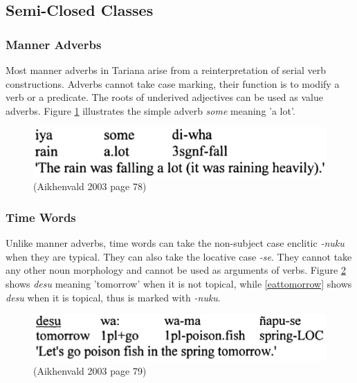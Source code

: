 \documentclass{article}
\begin{document}

\subsection{Semi-Closed Classes}
\subsubsection{Manner Adverbs}
Most manner adverbs in Tariana arise from a reinterpretation of serial verb constructions. Adverbs cannot take case marking, their function is to modify a verb or a predicate. The roots of underived adjectives can be used as value adverbs. Figure \ref*{raining} illustrates the simple adverb \textit{some} meaning 'a lot'.

\begin{figure}[h!]
\centering
\includegraphics[scale = 0.38]{raining.png}
	\caption{(Aikhenvald 2003 page 78)}
	\label{raining}
\end{figure}

\subsubsection{Time Words} \label{Time Words}
Unlike manner adverbs, time words can take the non-subject case enclitic \textit{-nuku} when they are typical. They can also take the locative case \textit{-se}. They cannot take any other noun morphology and cannot be used as arguments of verbs. Figure \ref*{poisonfish} shows \textit{desu} meaning 'tomorrow' when it is not topical, while \ref*{eattomorrow} shows \textit{desu} when it is topical, thus is marked with \textit{-nuku}.

\begin{figure}[h!]
\centering
\includegraphics[scale = 0.38]{poisonfish.png}
	\caption{(Aikhenvald 2003 page 79)}
	\label{poisonfish}
\end{figure}
\end{document}
